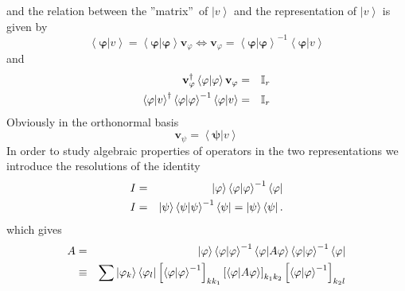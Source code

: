 \documentclass[aps,preprint]{revtex4}
\begin{document}
and the relation between the \textquotedblright matrix\textquotedblright\ of 
$\left\vert v\right\rangle $ and the representation of $\left\vert
v\right\rangle $ is given by%
\begin{equation}
\left\langle \mathbf{\varphi }|v\right\rangle =\left\langle \mathbf{\varphi
|\varphi }\right\rangle \mathbf{v}_{\varphi }\Longleftrightarrow \mathbf{v}%
_{\varphi }=\left\langle \mathbf{\varphi |\varphi }\right\rangle
^{-1}\left\langle \mathbf{\varphi }|v\right\rangle
\end{equation}%
and 
\begin{eqnarray}
\mathbf{v}_{\varphi }^{\dagger }\left\langle \mathbf{\varphi |\varphi }%
\right\rangle \mathbf{v}_{\varphi } &=&\mathbb{I}_{r}  \notag \\
\left\langle \mathbf{\varphi }|v\right\rangle ^{\dagger }\left\langle 
\mathbf{\varphi |\varphi }\right\rangle ^{-1}\left\langle \mathbf{\varphi }%
|v\right\rangle &=&\mathbb{I}_{r}
\end{eqnarray}%
Obviously in the orthonormal basis 
\begin{equation}
\mathbf{v}_{\psi }=\left\langle \mathbf{\psi }|v\right\rangle
\end{equation}%
In order to study algebraic properties of operators in the two
representations we introduce the resolutions of the identity 
\begin{eqnarray}
I &=&\left\vert \mathbf{\varphi }\right\rangle \left\langle \mathbf{\varphi }%
|\mathbf{\varphi }\right\rangle ^{-1}\left\langle \mathbf{\varphi }%
\right\vert  \notag \\
I &=&\left\vert \mathbf{\psi }\right\rangle \left\langle \mathbf{\psi }|%
\mathbf{\psi }\right\rangle ^{-1}\left\langle \mathbf{\psi }\right\vert
=\left\vert \mathbf{\psi }\right\rangle \left\langle \mathbf{\psi }%
\right\vert .
\end{eqnarray}%
which gives%
\begin{eqnarray}
A &=&\left\vert \mathbf{\varphi }\right\rangle \left\langle \mathbf{\varphi }%
|\mathbf{\varphi }\right\rangle ^{-1}\left\langle \mathbf{\varphi |}A\mathbf{%
\varphi }\right\rangle \left\langle \mathbf{\varphi }|\mathbf{\varphi }%
\right\rangle ^{-1}\left\langle \mathbf{\varphi }\right\vert  \notag \\
&\equiv &\sum \left\vert \varphi _{k}\right\rangle \left\langle \varphi
_{l}\right\vert \left[ \left\langle \mathbf{\varphi }|\mathbf{\varphi }%
\right\rangle ^{-1}\right] _{kk_{1}}\left[ \left\langle \mathbf{\varphi |}A%
\mathbf{\varphi }\right\rangle \right] _{k_{1}k_{2}}\left[ \left\langle 
\mathbf{\varphi }|\mathbf{\varphi }\right\rangle ^{-1}\right] _{k_{2}l}
\end{eqnarray}%
\end{document}

